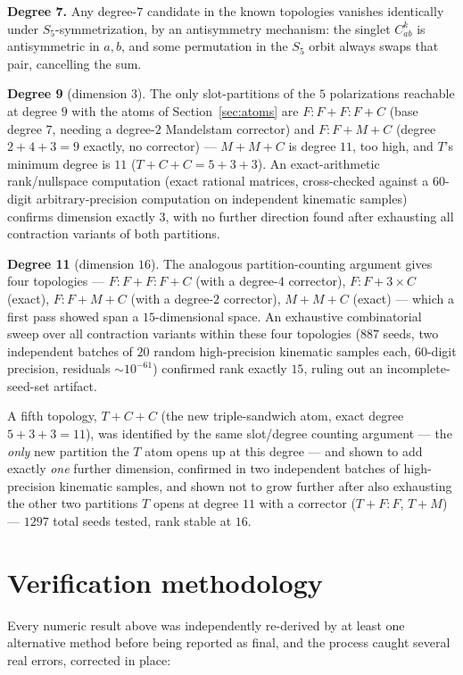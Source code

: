 \documentclass[reqno]{amsart}
\begin{document}
\textbf{Degree 7.} Any degree-$7$ candidate in the known topologies vanishes identically under
$S_5$-symmetrization, by an antisymmetry mechanism: the singlet $C^k_{ab}$ is antisymmetric in
$a,b$, and some permutation in the $S_5$ orbit always swaps that pair, cancelling the sum.

\textbf{Degree 9} (dimension $3$). The only slot-partitions of the $5$ polarizations reachable at
degree $9$ with the atoms of Section~\ref{sec:atoms} are $F{:}F+F{:}F+C$ (base degree $7$, needing
a degree-$2$ Mandelstam corrector) and $F{:}F+M+C$ (degree $2+4+3=9$ exactly, no corrector) ---
$M+M+C$ is degree $11$, too high, and $T$'s minimum degree is $11$ ($T+C+C=5+3+3$). An
exact-arithmetic rank/nullspace computation (exact rational matrices, cross-checked against a
$60$-digit arbitrary-precision computation on independent kinematic samples) confirms dimension
exactly $3$, with no further direction found after exhausting all contraction variants of both
partitions.

\textbf{Degree 11} (dimension $16$). The analogous partition-counting argument gives four
topologies --- $F{:}F+F{:}F+C$ (with a degree-$4$ corrector), $F{:}F+3\times C$ (exact),
$F{:}F+M+C$ (with a degree-$2$ corrector), $M+M+C$ (exact) --- which a first pass showed span a
$15$-dimensional space. An exhaustive combinatorial sweep over all contraction variants within
these four topologies ($887$ seeds, two independent batches of $20$ random high-precision
kinematic samples each, $60$-digit precision, residuals $\sim10^{-61}$) confirmed rank exactly
$15$, ruling out an incomplete-seed-set artifact.

A fifth topology, $T+C+C$ (the new triple-sandwich atom, exact degree $5+3+3=11$), was identified
by the same slot/degree counting argument --- the \emph{only} new partition the $T$ atom opens up
at this degree --- and shown to add exactly \emph{one} further dimension, confirmed in two
independent batches of high-precision kinematic samples, and shown not to grow further after also
exhausting the other two partitions $T$ opens at degree $11$ with a corrector ($T+F{:}F$, $T+M$)
--- $1297$ total seeds tested, rank stable at $16$.

\section{Verification methodology}
\label{sec:verification}

Every numeric result above was independently re-derived by at least one alternative method before
being reported as final, and the process caught several real errors, corrected in place:
\end{document}
